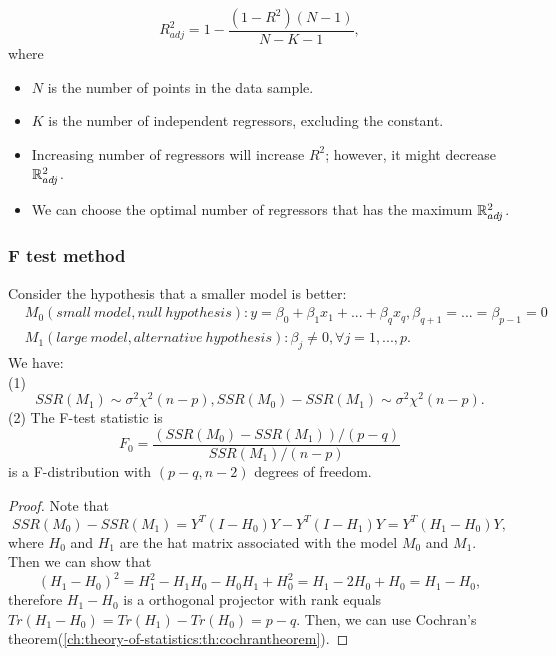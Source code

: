 \begin{refsection}
\begin{definition}
	$$R^2_{adj} = 1 - \frac{(1-R^2)(N-1)}{N-K-1},$$
	where \begin{itemize}
		\item $N$ is the number of points in the data sample.
		\item $K$ is the number of independent regressors, excluding the constant.
	\end{itemize}	
\end{definition}


\begin{remark}[interpretation]\hfill
	\begin{itemize}
		\item Increasing number of regressors will increase $R^2$; however, it might decrease $\mathbb{R}^2_{adj}$.
		\item We can choose the optimal number of regressors that has the maximum $\mathbb{R}_{adj}^2$.
	\end{itemize}	
\end{remark}

\subsubsection{F test method}
\begin{theorem}
	Consider the hypothesis that a smaller model is better: 
	\begin{align*}
	&M_0(small~model, null~hypothesis): y = \beta_0 + \beta_1x_1 + ... + \beta_{q}x_q, \beta_{q+1} = ... = \beta_{p-1} = 0\\
	&M_1(large~model, alternative~hypothesis): \beta_j \neq 0,\forall j=1,...,p.
	\end{align*}
	We have:\\
	(1)  $$SSR(M_1)\sim \sigma^2\chi^2(n-p),SSR(M_0) - SSR(M_1) \sim \sigma^2\chi^2(n-p).$$
	(2)
	The F-test statistic is
	$$F_0 = \frac{(SSR(M_0)-SSR(M_1))/(p-q)}{SSR(M_1)/(n-p)}$$
	is a F-distribution with $(p-q,n-2)$ degrees of freedom.\\
	
\end{theorem}
\begin{proof}
	Note that $$SSR(M_0) - SSR(M_1) = Y^T(I-H_0)Y - Y^T(I-H_1)Y = Y^T(H_1-H_0)Y,$$
	where $H_0$ and $H_1$ are the hat matrix associated with the model $M_0$ and $M_1$. Then we can show that
	$$(H_1-H_0)^2=H_1^2-H_1H_0-H_0H_1 + H_0^2 = H_1 - 2H_0 + H_0 = H_1-H_0,$$
	therefore $H_1-H_0$ is a orthogonal projector with rank equals $Tr(H_1-H_0) = Tr(H_1)-Tr(H_0) = p-q$. Then, we can use Cochran's theorem(\autoref{ch:theory-of-statistics:th:cochrantheorem}).
\end{proof}




\end{refsection}
